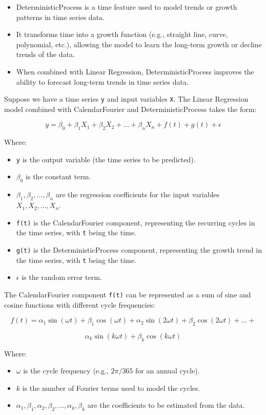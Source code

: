\documentclass{ieeeojies}
\begin{document}
\begin{itemize}
    \item DeterministicProcess is a time feature used to model trends or growth patterns in time series data.
    \item It transforms time into a growth function (e.g., straight line, curve, polynomial, etc.), allowing the model to learn the long-term growth or decline trends of the data.
    \item When combined with Linear Regression, DeterministicProcess improves the ability to forecast long-term trends in time series data.
\end{itemize}
 
Suppose we have a time series \verb|y| and input variables \verb|X|. The Linear Regression model combined with CalendarFourier and DeterministicProcess takes the form: 

$$y = \beta_0 + \beta_1X_1 + \beta_2X_2 + ... + \beta_nX_n + f(t) + g(t) + \epsilon$$

Where:

\begin{itemize}
    \item \verb|y| is the output variable (the time series to be predicted).
    \item $\beta_0$ is the constant term.
\item $\beta_1, \beta_2, ..., \beta_n$ are the regression coefficients for the input variables $X_1, X_2, ..., X_n$.
    \item \verb|f(t)| is the CalendarFourier component, representing the recurring cycles in the time series, with \verb|t| being the time.
    \item \verb|g(t)| is the DeterministicProcess component, representing the growth trend in the time series, with \verb|t| being the time.
\item $\epsilon$ is the random error term.
\end{itemize}

 The CalendarFourier component \verb|f(t)| can be represented as a sum of sine and cosine functions with different cycle frequencies: 
 
$$f(t) = \alpha_1\sin(\omega t) + \beta_1\cos(\omega t) + \alpha_2\sin(2\omega t) + \beta_2\cos(2\omega t) + ... + $$

$$\alpha_k\sin(k\omega t) + \beta_k\cos(k\omega t)$$

 Where:

\begin{itemize}
\item $\omega$ is the cycle frequency (e.g., $2\pi/365$ for an annual cycle).
    \item $k$ is the number of Fourier terms used to model the cycles.
\item $\alpha_1, \beta_1, \alpha_2, \beta_2, ..., \alpha_k, \beta_k$ are the coefficients to be estimated from the data.
\end{itemize}
\end{document}
